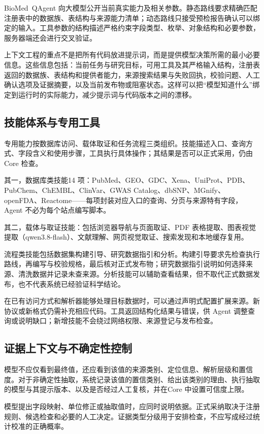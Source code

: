 \mbox{BioMed QAgent} 向大模型公开当前真实能力及相关参数。静态路线要求精确匹配注册表中的数据族、表结构与来源能力清单；动态路线只接受预检报告确认可以绑定的输入。工具参数的结构描述严格约束字段类型、枚举、对象结构和必要参数，服务器端还会进行交叉验证。

上下文工程的重点不是把所有代码放进提示词，而是提供模型决策所需的最小必要信息。这些信息包括：当前任务与研究目标，可用工具及其严格输入结构，注册表返回的数据族、表结构和提供者能力，来源搜索结果与失败回执，校验问题、人工确认选项及证据摘要，以及当前发布物或阻塞状态。这样可以把“模型知道什么”绑定到运行时的实际能力，减少提示词与代码版本之间的漂移。

\subsection{技能体系与专用工具}\label{subsec:skills}

专用能力按数据库访问、载体取证和任务流程三类组织。技能描述入口、查询方式、字段含义和使用步骤，工具执行具体操作；其结果是否可以正式采用，仍由 Core 检查。

其一，数据库类技能14 项：PubMed、GEO、GDC、Xena、UniProt、PDB、PubChem、ChEMBL、ClinVar、GWAS Catalog、dbSNP、MGnify、openFDA、Reactome——每项封装对应入口的查询、分页与来源特有字段，Agent 不必为每个站点编写脚本。

其二，载体与取证技能：包括浏览器导航与页面取证、PDF 表格提取、图表视觉提取（qwen3.8-flash）、文献理解、网页视觉取证、搜索发现和本地缓存复用。

流程类技能包括数据集构建引导、研究数据指引和分析。构建引导要求先检查执行路线，再编写与校验规格，最后核对正式发布物；研究数据指引说明如何选择来源、清洗数据并记录未查来源。分析技能可以辅助查看结果，但不取代正式数据发布，也不代表系统已经验证科学结论。

在已有访问方式和解析器能够处理目标数据时，可以通过声明式配置扩展来源。新协议或新格式仍需补充相应代码。工具返回结构化结果与错误，供 Agent 调整查询或说明缺口；新增技能不会绕过网络权限、来源登记与发布检查。

\subsection{证据上下文与不确定性控制}\label{subsec:evidence-context}

模型不应仅看到最终值，还应看到该值的来源类别、定位信息、解析层级和置信度。对于非确定性抽取，系统记录该值的置信类别、给出该类别的理由、执行抽取的模型与其提示版本、以及是否经过人工复核，并在Core 中设置可信度上限。

模型提出字段映射、单位修正或抽取值时，应同时说明依据。正式采纳取决于注册规则、候选检查和必要的人工决定。证据类型分级用于安排检查，不应写成经过统计校准的正确概率。

